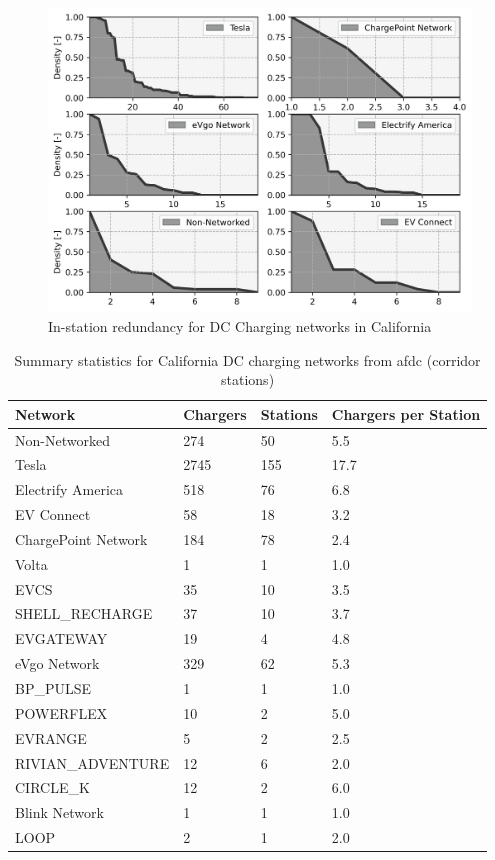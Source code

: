 \begin{figure}[H]
	\centering
	\includegraphics[width = \linewidth]{figs/California_RIS_SF_Corridor.png}
	\caption{In-station redundancy for DC Charging networks in California}
	\label{fig:ris_top_networks_corridor}
\end{figure}

\begin{table}[H]
	\centering
	\caption{Summary statistics for California DC charging networks from \gls{afdc} (corridor stations)}
	\label{tab:summary_statistics_afdc_corridor}
	\begin{tabular}{|C{.46\linewidth}|C{.18\linewidth}|C{.18\linewidth}|C{.18\linewidth}|}
		\hline Network & Chargers & Stations & Chargers per Station \\
		\hline Non-Networked & 274 & 50 & 5.5 \\
		\hline Tesla & 2745 & 155 & 17.7 \\
		\hline Electrify America & 518 & 76 & 6.8 \\
		\hline EV Connect & 58 & 18 & 3.2 \\
		\hline ChargePoint Network & 184 & 78 & 2.4 \\
		\hline Volta & 1 & 1 & 1.0 \\
		\hline EVCS & 35 & 10 & 3.5 \\
		\hline SHELL_RECHARGE & 37 & 10 & 3.7 \\
		\hline EVGATEWAY & 19 & 4 & 4.8 \\
		\hline eVgo Network & 329 & 62 & 5.3 \\
		\hline BP_PULSE & 1 & 1 & 1.0 \\
		\hline POWERFLEX & 10 & 2 & 5.0 \\
		\hline EVRANGE & 5 & 2 & 2.5 \\
		\hline RIVIAN_ADVENTURE & 12 & 6 & 2.0 \\
		\hline CIRCLE_K & 12 & 2 & 6.0 \\
		\hline Blink Network & 1 & 1 & 1.0 \\
		\hline LOOP & 2 & 1 & 2.0 \\
		\hline
	\end{tabular}
\end{table}

